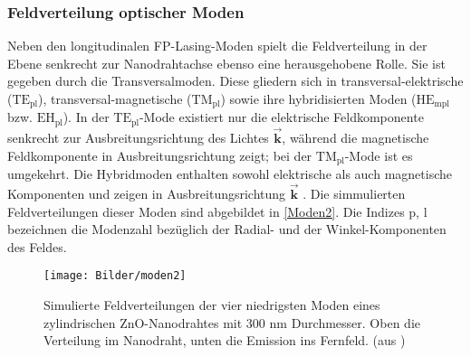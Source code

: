 \subsubsection{Feldverteilung optischer Moden}
Neben den longitudinalen FP-Lasing-Moden spielt die Feldverteilung in der Ebene senkrecht zur Nanodrahtachse ebenso eine herausgehobene Rolle. Sie ist gegeben durch die Transversalmoden. Diese gliedern sich in transversal-elektrische ($\text{TE}_\text{pl}$), transversal-magnetische ($\text{TM}_\text{pl}$) sowie ihre hybridisierten Moden ($\text{HE}_\text{mpl}$ bzw. $\text{EH}_\text{pl}$). In der $\text{TE}_\text{pl}$-Mode existiert nur die elektrische Feldkomponente senkrecht zur Ausbreitungsrichtung des Lichtes $\vec{\textbf{k}}$, während die magnetische Feldkomponente in Ausbreitungsrichtung zeigt; bei der $\text{TM}_\text{pl}$-Mode ist es umgekehrt. Die Hybridmoden enthalten sowohl elektrische als auch magnetische Komponenten und zeigen in Ausbreitungsrichtung $\vec{\textbf{k}}$ \cite{Kneubuhl.2008}. Die simmulierten Feldverteilungen dieser Moden sind abgebildet in \autoref{Moden2}. Die Indizes p, l bezeichnen die Modenzahl bezüglich der Radial- und der Winkel-Komponenten des Feldes. 
\begin{figure}[hb]
\centering
\texttt{[image: Bilder/moden2]}
\caption[Feldverteilung der Moden eines ZnO-Nanodrahtes]{Simulierte Feldverteilungen der vier niedrigsten Moden eines zylindrischen ZnO-Nanodrahtes mit 300 nm Durchmesser. Oben die Verteilung im Nanodraht, unten die Emission ins Fernfeld. (aus \cite{Roeder.Diss})}
\label{Moden2}
\end{figure}
